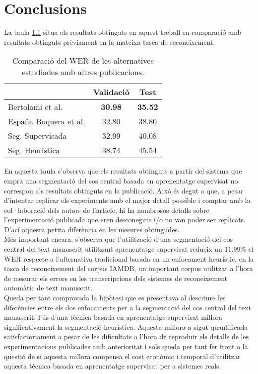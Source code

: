 \chapter{Conclusions}
\label{cap:con}

La taula \ref{tab:summary} situa els resultats obtinguts en aquest treball en comparació amb resultats obtinguts prèviament en la mateixa tasca de reconeixement.\\

\begin{table}
\begin{center}
\begin{tabular}{|l|c|c|}
\hline
& Validació & Test \\\hline\hline
Bertolami et al. \cite{bertolami2008hidden} & \textbf{30.98} & \textbf{35.52} \\\hline
España Boquera et al. \cite{espana2011improving} & 32.80 & 38.80  \\\hline
Seg. Supervisada & 32.99 & 40.08 \\\hline
Seg. Heurística & 38.74 & 45.54 \\\hline
\end{tabular}
\caption{Comparació del WER de les alternatives estudiades amb altres publicacions.}\label{tab:summary}
\end{center}
\end{table}

En aquesta taula s'observa que els resultats obtinguts a partir del sistema que empra una segmentació del cos central basada en aprenentatge supervisat no correspon als resultats obtinguts en la publicació. Això és degut a que, a pesar d'intentar replicar els experiments amb el major detall possible i comptar amb la col·laboració dels autors de l'article, hi ha nombrosos detalls sobre l'ex\-pe\-ri\-men\-ta\-ció publicada que eren desconeguts i/o no van poder ser replicats. D'ací aquesta petita diferència en les mesures obtingudes.\\

Més important encara, s'observa que l'utilització d'una segmentació del cos central del text manuscrit utilitzant aprenentatge supervisat redueix un $11.99\%$ el WER respecte a l'alternativa tradicional basada en un enfocament heurístic, en la tasca de reconeixement del corpus IAMDB, un important corpus utilitzat a l'hora de mesurar els errors en les transcripcions dels sistemes de reconeixement automàtic de text manuscrit.\\

Queda per tant comprovada la hipòtesi que es presentava al descriure les diferències entre els dos enfocaments per a la segmentació del cos central del text manuscrit: l'ús d'una tècnica basada en aprenentatge supervisat millora significativament la segmentació heurística. Aquesta millora a sigut quantificada satisfactoriament a pesar de les dificultats a l'hora de reproduir els detalls de les experimentacions publicades amb anterioritat i sols queda per tant fer front a la qüestió de si aquesta millora compensa el cost econòmic i temporal d'utilitzar aquesta tècnica basada en aprenentatge supervisat per a sistemes reals.